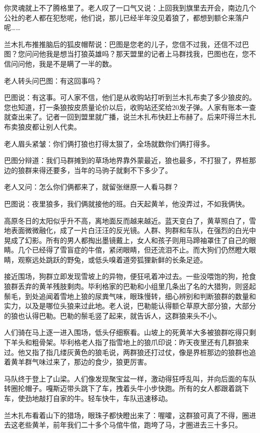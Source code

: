 \par 你灵魂就上不了腾格里了。老人叹了一口气又说：上回我到旗里去开会，南边几个公社的老人都在犯愁呢，他们说，那儿已经半年没见着狼了，都想到额仑来落户呢……
\par 兰木扎布推推脑后的狐皮帽帮说：巴图是您老的儿子，您信不过我，还信不过巴图？您问问他我是想当打狼英雄吗？那天盟里的记者上马群找我，巴图也在，您不信问问他，我是不是瞒了一半的数。
\par 老人转头问巴图：有这回事吗？
\par 巴图说：有这事。可人家不信，他们是从收购站打听到兰木扎布卖了多少狼皮的。您也知道，打一条狼按皮质量论价以后，收购站还奖给20发子弹。人家有账本一查就查出来了。记者一回到盟里就广播，说兰木扎布快赶上布赫了。后来吓得兰木扎布卖狼皮都让别人代卖。
\par 老人眉头紧皱：你们俩打狼也打得太狠了，全场就数你们俩打得多。
\par 巴图分辩道：我们马群摊到的草场地界靠外蒙最近，狼也最多，不打狠了，界桩那边的狼群来得还要多，当年的马驹子就剩不下多少了。
\par 老人又问：怎么你们俩都来了，就留张继原一人看马群？
\par 巴图说：夜里狼多，我们俩就接他的班。白天起黄羊，他没弄过，不如我俩快。
\par 高原冬日的太阳似乎升不高，离地面反而越来越近。蓝天变白了，黄草照白了，雪地表面微微融化，成了一片白汪汪的反光镜。人群、狗群和车队，在强烈的白光中晃成了幻影。所有的男人都掏出墨镜戴上，女人和孩子则用马蹄袖罩住了自己的眼睛。几个已经得了雪盲症的牛倌，紧闭眼睛，但还流泪不止。而大狗们仍然瞪大眼睛，观察远处跳跃的野兔，或低头嗅着道旁狐狸新鲜的长条足迹。
\par 接近围场，狗群立即发现雪坡上的异物，便狂吼着冲过去。一些没喂饱的狗，抢食狼群丢弃的黄羊残肢剩肉。毕利格家的巴勒和小组里几条出了名的大猎狗，则竖起鬃毛，到处追闻着雪地上狼的尿粪气味，眼珠慢转，细心辨别和判断狼群的数量和实力，以及是哪位头狼来过此地。老人说，巴勒能认得额仑草原大部分狼，大部分的狼也认得巴勒。巴勒的鬃毛竖了起来，就告诉人，这群狼来头不小。
\par 人们骑在马上逐一进入围场，低头仔细察看。山坡上的死黄羊大多被狼群吃得只剩下羊头和粗骨架。毕利格老人指了指雪地上的狼爪印说：昨天夜里还有几群狼来过。他又指了指几缕灰黄色的狼毛说，两群狼还打过仗，像是界桩那边的狼群也追着黄羊群气味过来了，那边的食少，狼更厉害。
\par 马队终于登上了山梁。人们像发现聚宝盆一样，激动得狂呼乱叫，并向后面的车队转圈抡帽子。嘎斯迈带头跳下了车，拽着头牛小步快跑。所有的女人都跟着跳下车，使劲地敲打自家的牛。轻车快牛，车队迅速移动。
\par 兰木扎布看着山下的猎场，眼珠子都快瞪出来了：喔嚯，这群狼可真了不得，圈进去这老些黄羊，前年我们二十多个马倌牛倌，跑垮了马，才圈进去三十多只。
